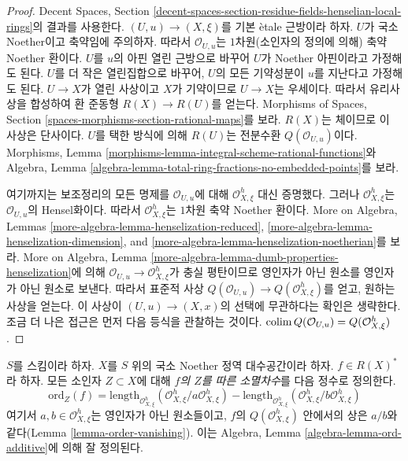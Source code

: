 \begin{proof}
Decent Spaces, Section
\ref{decent-spaces-section-residue-fields-henselian-local-rings}의 결과를
사용한다. $(U, u) \to (X, \xi)$를 기본 \`etale 근방이라 하자. $U$가
국소 Noether이고 축약임에 주의하자. 따라서 $\mathcal{O}_{U, u}$는
$1$차원(소인자의 정의에 의해) 축약 Noether 환이다. $U$를 $u$의 아핀
열린 근방으로 바꾸어 $U$가 Noether 아핀이라고 가정해도 된다. $U$를
더 작은 열린집합으로 바꾸어, $U$의 모든 기약성분이 $u$를 지난다고
가정해도 된다. $U \to X$가 열린 사상이고 $X$가 기약이므로
$U \to X$는 우세이다. 따라서 유리사상을 합성하여 환 준동형
$R(X) \to R(U)$를 얻는다. Morphisms of Spaces, Section
\ref{spaces-morphisms-section-rational-maps}를 보라. $R(X)$는 체이므로 이
사상은 단사이다. $U$를 택한 방식에 의해 $R(U)$는 전분수환
$Q(\mathcal{O}_{U, u})$이다. Morphisms, Lemma
\ref{morphisms-lemma-integral-scheme-rational-functions}와 Algebra, Lemma
\ref{algebra-lemma-total-ring-fractions-no-embedded-points}를 보라.

\medskip\noindent
여기까지는 보조정리의 모든 명제를 $\mathcal{O}_{U, u}$에 대해
$\mathcal{O}_{X, \xi}^h$ 대신 증명했다. 그러나
$\mathcal{O}_{X, \xi}^h$는 $\mathcal{O}_{U, u}$의 Hensel화이다. 따라서
$\mathcal{O}_{X, \xi}^h$는 $1$차원 축약 Noether 환이다. More on
Algebra, Lemmas \ref{more-algebra-lemma-henselization-reduced},
\ref{more-algebra-lemma-henselization-dimension}, and
\ref{more-algebra-lemma-henselization-noetherian}를 보라. More on Algebra,
Lemma \ref{more-algebra-lemma-dumb-properties-henselization}에 의해
$\mathcal{O}_{U, u} \to \mathcal{O}_{X, \xi}^h$가 충실 평탄이므로
영인자가 아닌 원소를 영인자가 아닌 원소로 보낸다. 따라서 표준적 사상
$Q(\mathcal{O}_{U, u}) \to Q(\mathcal{O}_{X, \xi}^h)$를 얻고, 원하는
사상을 얻는다. 이 사상이
$(U, u) \to (X, x)$의 선택에 무관하다는 확인은 생략한다. 조금 더 나은
접근은 먼저 다음 등식을 관찰하는 것이다.
$\mathop{\mathrm{colim}}\nolimits Q(\mathcal{O}_{U, u}) = Q(\mathcal{O}_{X, \xi}^h)$.
\end{proof}

\begin{definition}
\label{definition-order-vanishing}
$S$를 스킴이라 하자. $X$를 $S$ 위의 국소 Noether 정역 대수공간이라
하자. $f \in R(X)^*$라 하자. 모든 소인자 $Z \subset X$에 대해
{\it $f$의 $Z$를 따른 소멸차수}를 다음 정수로 정의한다.
$$
\text{ord}_Z(f) =
\text{length}_{\mathcal{O}_{X, \xi}^h}
(\mathcal{O}_{X, \xi}^h/a \mathcal{O}_{X, \xi}^h) -
\text{length}_{\mathcal{O}_{X, \xi}^h}
(\mathcal{O}_{X, \xi}^h/b \mathcal{O}_{X, \xi}^h)
$$
여기서 $a, b \in \mathcal{O}_{X, \xi}^h$는 영인자가 아닌 원소들이고,
$f$의 $Q(\mathcal{O}_{X, \xi}^h)$ 안에서의 상은 $a/b$와 같다(Lemma
\ref{lemma-order-vanishing}). 이는 Algebra, Lemma
\ref{algebra-lemma-ord-additive}에 의해 잘 정의된다.
\end{definition}


